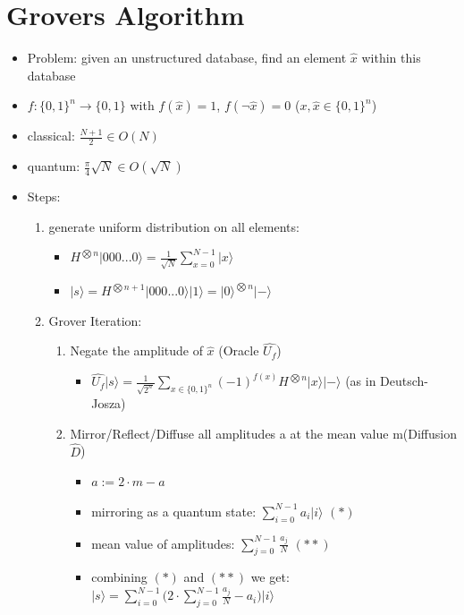 \documentclass[12pt,a4paper]{article}
\newcommand{\ecb}[1]{\{#1\}}
\newcommand{\ket}[1]{\vert #1 \rangle}
\begin{document}
\section{Grovers Algorithm}
\begin{itemize}
\item Problem: given an unstructured database, find an element $\hat{x}$ within this database
\item $f : \ecb{0,1}^n \rightarrow \ecb{0,1}$ with $f(\hat{x}) = 1$, $f(\lnot \hat{x}) = 0$ \hspace{1cm}($x, \hat{x} \in \ecb{0,1}^n$)
\item classical: $\frac{N+1}{2} \in O(N)$
\item quantum: $\frac{\pi}{4}\sqrt{N} \in O(\sqrt{N})$
\item Steps:
\begin{enumerate}
\item generate uniform distribution on all elements:\\
\begin{itemize}
\item $\displaystyle H^{\bigotimes n}\ket{000...0}=\frac{1}{\sqrt{N}} \sum_{x=0}^{N-1} \ket{x}$
\item $\displaystyle\ket{s} = H^{\bigotimes n+1} \ket{000...0}\ket{1} = \ket{0}^{\bigotimes n}\ket{-}$
\end{itemize}
\item Grover Iteration:
\begin{enumerate}
\item Negate the amplitude of $\hat{x}$ (Oracle $\hat{U_f}$)
\begin{itemize}
\item $\displaystyle \hat{U_f}\ket{s} = \frac{1}{\sqrt{2^n}} \sum_{x\in\ecb{0,1}^n} (-1)^{f(x)}H^{\bigotimes n}\ket{x}\ket{-}$ \hspace{0.2cm}(as in Deutsch-Josza)
\end{itemize}
\item Mirror/Reflect/Diffuse all amplitudes a at the mean value m(Diffusion $\hat{D}$)
\begin{itemize}
\item $a := 2\cdot m - a$
\item mirroring as a quantum state: $\displaystyle \sum_{i=0}^{N-1} a_i \ket{i}$ $(\ast)$
\item mean value of amplitudes: $\displaystyle \sum_{j=0}^{N-1} \frac{a_j}{N}$ $(\ast\ast)$
\item combining $(\ast)$ and $(\ast\ast)$ we get: $\displaystyle\ket{s} = \sum_{i=0}^{N-1} \bigg( 2\cdot \sum_{j=0}^{N-1} \frac{a_j}{N}-a_i\bigg) \ket{i}$

\end{itemize}
\end{enumerate}
\end{enumerate}
\end{itemize}
\end{document}
